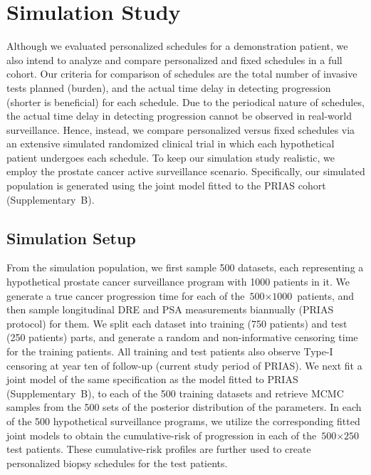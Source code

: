 \section{Simulation Study}
\label{sec:sim_study}
Although we evaluated personalized schedules for a demonstration patient, we also intend to analyze and compare personalized and fixed schedules in a full cohort. Our criteria for comparison of schedules are the total number of invasive tests planned (burden), and the actual time delay in detecting progression (shorter is beneficial) for each schedule. Due to the periodical nature of schedules, the actual time delay in detecting progression cannot be observed in real-world surveillance. Hence, instead, we compare personalized versus fixed schedules via an extensive simulated randomized clinical trial in which each hypothetical patient undergoes each schedule. To keep our simulation study realistic, we employ the prostate cancer active surveillance scenario. Specifically, our simulated population is generated using the joint model fitted to the PRIAS cohort (Supplementary~B).

\subsection{Simulation Setup}
From the simulation population, we first sample 500 datasets, each representing a hypothetical prostate cancer surveillance program with 1000 patients in it. We generate a true cancer progression time for each of the ${\mbox{500} \times \mbox{1000}}$ patients, and then sample longitudinal DRE and PSA measurements biannually (PRIAS protocol) for them. We split each dataset into training (750 patients) and test (250 patients) parts, and generate a random and non-informative censoring time for the training patients. All training and test patients also observe Type-I censoring at year ten of follow-up (current study period of PRIAS). We next fit a joint model of the same specification as the model fitted to PRIAS (Supplementary~B), to each of the 500 training datasets and retrieve MCMC samples from the 500 sets of the posterior distribution of the parameters. In each of the 500 hypothetical surveillance programs, we utilize the corresponding fitted joint models to obtain the cumulative-risk of progression in each of the ${\mbox{500} \times \mbox{250}}$ test patients. These cumulative-risk profiles are further used to create personalized biopsy schedules for the test patients. 

